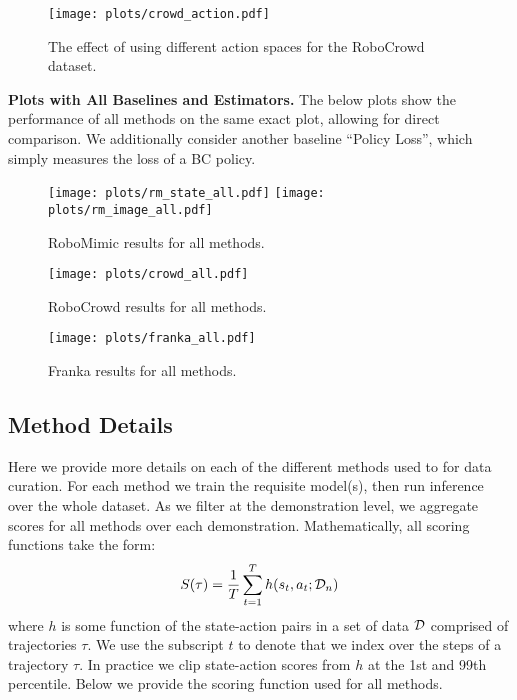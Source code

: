 \begin{figure}[ht]
    \centering
    \texttt{[image: plots/crowd\_action.pdf]}
    \vspace{-0.1in}
    \caption{The effect of using different action spaces for the RoboCrowd dataset.}
\end{figure}

\noindent \textbf{Plots with All Baselines and Estimators.} The below plots show the performance of all methods on the same exact plot, allowing for direct comparison. We additionally consider another baseline ``Policy Loss'', which simply measures the loss of a BC policy.

\begin{figure}[ht]
    \centering
    \texttt{[image: plots/rm\_state\_all.pdf]}
    \texttt{[image: plots/rm\_image\_all.pdf]}
    \vspace{-0.1in}
    \caption{RoboMimic results for all methods.}
\end{figure}


\begin{figure}[ht]
    \centering
    \texttt{[image: plots/crowd\_all.pdf]}
    \vspace{-0.1in}
    \caption{RoboCrowd results for all methods.}
\end{figure}

\begin{figure}[ht]
    \centering
    \texttt{[image: plots/franka\_all.pdf]}
    \vspace{-0.1in}
    \caption{Franka results for all methods.}
\end{figure}




\subsection{Method Details}
Here we provide more details on each of the different methods used to for data curation. For each method we train the requisite model(s), then run inference over the whole dataset. As we filter at the demonstration level, we aggregate scores for all methods over each demonstration. Mathematically, all scoring functions take the form:
\begin{equation*}
    S(\tau) = \frac{1}{T} \sum_{t=1}^{T} h(s_t, a_t ; \mathcal{D}_n)
\end{equation*}
where $h$ is some function of the state-action pairs in a set of data $\mathcal{D}$ comprised of trajectories $\tau$. We use the subscript $t$ to denote that we index over the steps of a trajectory $\tau$. In practice we clip state-action scores from $h$ at the 1st and 99th percentile. Below we provide the scoring function used for all methods.

